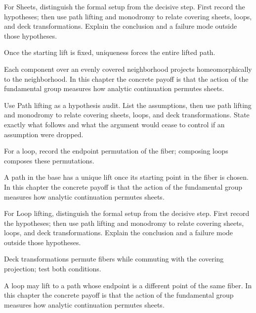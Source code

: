 \begin{exercise}\label{exr:iv23-02}
For Sheets, distinguish the formal setup from the decisive step. First record the hypotheses; then use path lifting and monodromy to relate covering sheets, loops, and deck transformations. Explain the conclusion and a failure mode outside those hypotheses.
\end{exercise}
\begin{hint}
Once the starting lift is fixed, uniqueness forces the entire lifted path.
\end{hint}
\begin{solution}
Each component over an evenly covered neighborhood projects homeomorphically to the neighborhood. In this chapter the concrete payoff is that the action of the fundamental group measures how analytic continuation permutes sheets.
\end{solution}

\begin{exercise}\label{exr:iv23-03}
Use Path lifting as a hypothesis audit. List the assumptions, then use path lifting and monodromy to relate covering sheets, loops, and deck transformations. State exactly what follows and what the argument would cease to control if an assumption were dropped.
\end{exercise}
\begin{hint}
For a loop, record the endpoint permutation of the fiber; composing loops composes these permutations.
\end{hint}
\begin{solution}
A path in the base has a unique lift once its starting point in the fiber is chosen. In this chapter the concrete payoff is that the action of the fundamental group measures how analytic continuation permutes sheets.
\end{solution}

\begin{exercise}\label{exr:iv23-04}
For Loop lifting, distinguish the formal setup from the decisive step. First record the hypotheses; then use path lifting and monodromy to relate covering sheets, loops, and deck transformations. Explain the conclusion and a failure mode outside those hypotheses.
\end{exercise}
\begin{hint}
Deck transformations permute fibers while commuting with the covering projection; test both conditions.
\end{hint}
\begin{solution}
A loop may lift to a path whose endpoint is a different point of the same fiber. In this chapter the concrete payoff is that the action of the fundamental group measures how analytic continuation permutes sheets.
\end{solution}

